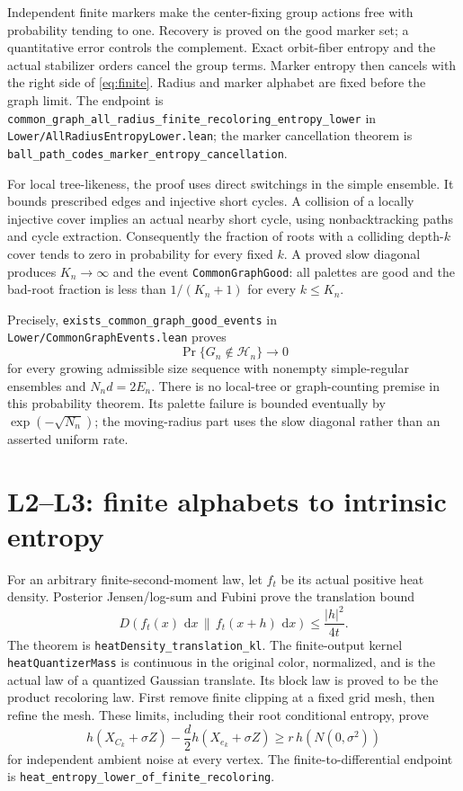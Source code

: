 \documentclass[11pt]{article}
\newcommand{\dd}{\,\mathrm d}
\newcommand{\lean}[1]{{\small\nolinkurl{#1}}}
\begin{document}
Independent finite markers make the center-fixing group actions free with
probability tending to one. Recovery is proved on the good marker set;
a quantitative error controls the complement. Exact orbit-fiber entropy
and the actual stabilizer orders cancel the group terms. Marker entropy
then cancels with the right side of \eqref{eq:finite}. Radius and marker
alphabet are fixed before the graph limit. The endpoint is
\lean{common_graph_all_radius_finite_recoloring_entropy_lower}
in \lean{Lower/AllRadiusEntropyLower.lean}; the marker cancellation theorem
is \lean{ball_path_codes_marker_entropy_cancellation}.

For local tree-likeness, the proof uses direct switchings in the simple
ensemble. It bounds prescribed edges and injective short cycles. A collision
of a locally injective cover implies an actual nearby short cycle, using
nonbacktracking paths and cycle extraction. Consequently the fraction of
roots with a colliding depth-$k$ cover tends to zero in probability for every
fixed $k$. A proved slow diagonal produces $K_n\to\infty$ and the event
\lean{CommonGraphGood}: all palettes are good and the bad-root fraction is
less than $1/(K_n+1)$ for every $k\leq K_n$.

Precisely, \lean{exists_common_graph_good_events} in
\lean{Lower/CommonGraphEvents.lean} proves
\[
 \Pr\{G_n\notin\mathcal H_n\}\longrightarrow0
\]
for every growing admissible size sequence with nonempty simple-regular
ensembles and $N_nd=2E_n$. There is no local-tree or graph-counting premise
in this probability theorem. Its palette failure is bounded eventually by
$\exp(-\sqrt{N_n})$; the moving-radius part uses the slow diagonal rather
than an asserted uniform rate.

\section{L2--L3: finite alphabets to intrinsic entropy}
For an arbitrary finite-second-moment law, let $f_t$ be its actual positive
heat density. Posterior Jensen/log-sum and Fubini prove the translation bound
\[
 D(f_t(x)\,\dd x\,\|\,f_t(x+h)\,\dd x)
 \leq\frac{|h|^2}{4t}.
\]
The theorem is \lean{heatDensity_translation_kl}. The finite-output kernel
\lean{heatQuantizerMass} is continuous in the original color, normalized,
and is the actual law of a quantized Gaussian translate. Its block law is
proved to be the product recoloring law. First remove finite clipping at a
fixed grid mesh, then refine the mesh. These limits, including their root
conditional entropy, prove
\[
 h(X_{C_k}+\sigma Z)-\frac d2h(X_{e_k}+\sigma Z)
 \geq r\,h(N(0,\sigma^2))
\]
for independent ambient noise at every vertex. The finite-to-differential
endpoint is \lean{heat_entropy_lower_of_finite_recoloring}.
\end{document}
